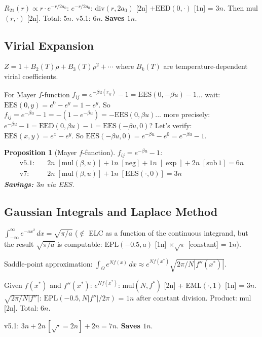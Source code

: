 \documentclass[11pt]{article}
\newtheorem{proposition}[theorem]{Proposition}
\begin{document}
$R_{21}(r)\propto r\cdot e^{-r/2a_0}$:
$e^{-r/2a_0}$: $\mathrm{div}(r,2a_0)$ [2n] $+\mathrm{EED}(0,\cdot)$ [1n] = $3n$.
Then mul$(r,\cdot)$ [2n]. Total: $5n$. v5.1: $6n$. \textbf{Saves $1n$}.

\subsection{Virial Expansion}

$Z=1+B_2(T)\rho+B_3(T)\rho^2+\cdots$ where $B_k(T)$ are temperature-dependent virial coefficients.

For Mayer $f$-function $f_{ij}=e^{-\beta u(r_{ij})}-1=\mathrm{EES}(0,-\beta u)-1$... wait:
$\mathrm{EES}(0,y)=e^0-e^y=1-e^y$.
So $f_{ij}=e^{-\beta u}-1=-(1-e^{-\beta u})=-\mathrm{EES}(0,\beta u)$... more precisely:
$e^{-\beta u}-1 = \mathrm{EED}(0,\beta u)-1 = \mathrm{EES}(-\beta u, 0)$? Let's verify:
$\mathrm{EES}(x,y)=e^x-e^y$. So $\mathrm{EES}(-\beta u, 0)=e^{-\beta u}-e^0=e^{-\beta u}-1$.

\begin{proposition}[Mayer $f$-function]
$f_{ij}=e^{-\beta u}-1$:
\begin{align*}
\text{v5.1:} &\quad 2n\;[\mathrm{mul}(\beta,u)]+1n\;[\mathrm{neg}]+1n\;[\exp]+2n\;[\mathrm{sub}\,1] = 6n\\
\text{v7:}   &\quad 2n\;[\mathrm{mul}(\beta,u)] + 1n\;[\mathrm{EES}(\cdot,0)] = 3n
\end{align*}
\textbf{Savings: $3n$} via EES.
\end{proposition}

\subsection{Gaussian Integrals and Laplace Method}

$\int_{-\infty}^\infty e^{-ax^2}\,dx = \sqrt{\pi/a}$ ($\notin$ ELC as a function of the continuous integrand,
but the result $\sqrt{\pi/a}$ is computable: $\mathrm{EPL}(-0.5,a)$ [1n] $\times\sqrt\pi$ [constant] = $1n$).

Saddle-point approximation:
$\int_\Omega e^{N f(x)}\,dx\approx e^{Nf(x^*)}\sqrt{2\pi/N|f''(x^*)|}$.

Given $f(x^*)$ and $f''(x^*)$:
$e^{Nf(x^*)}$: mul$(N,f^*)$ [2n] + EML$(\cdot,1)$ [1n] = $3n$.
$\sqrt{2\pi/N|f''|}$: $\mathrm{EPL}(-0.5, N|f''|/2\pi)$ = $1n$ after constant division.
Product: mul [2n]. Total: $6n$.

v5.1: $3n + 2n\,[\sqrt{\cdot}=2n] + 2n = 7n$. \textbf{Saves $1n$}.
\end{document}
